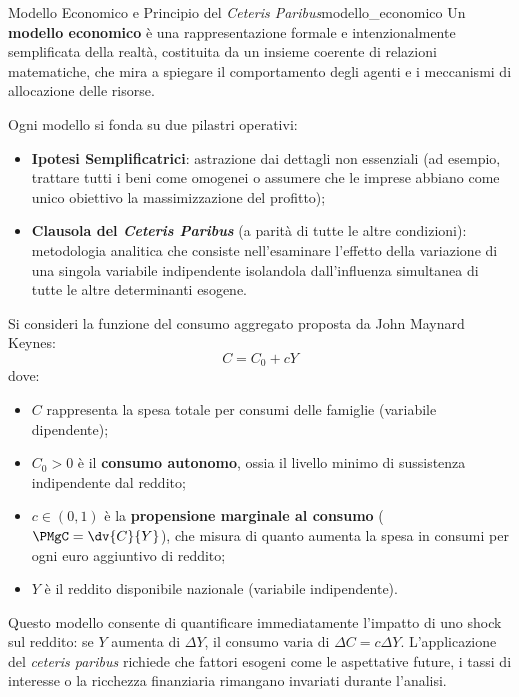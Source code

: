 \begin{modello}{Modello Economico e Principio del \textit{Ceteris Paribus}}{modello_economico}
Un \textbf{modello economico} è una rappresentazione formale e intenzionalmente semplificata della realtà, costituita da un insieme coerente di relazioni matematiche, che mira a spiegare il comportamento degli agenti e i meccanismi di allocazione delle risorse.

Ogni modello si fonda su due pilastri operativi:
\begin{itemize}
    \item \textbf{Ipotesi Semplificatrici}: astrazione dai dettagli non essenziali (ad esempio, trattare tutti i beni come omogenei o assumere che le imprese abbiano come unico obiettivo la massimizzazione del profitto);
    \item \textbf{Clausola del \textit{Ceteris Paribus}} (a parità di tutte le altre condizioni): metodologia analitica che consiste nell'esaminare l'effetto della variazione di una singola variabile indipendente isolandola dall'influenza simultanea di tutte le altre determinanti esogene.
\end{itemize}
\end{modello}

\begin{esempio}
Si consideri la funzione del consumo aggregato proposta da John Maynard Keynes:
\begin{equation}
    C = C_0 + c Y
\end{equation}
dove:
\begin{itemize}
    \item $C$ rappresenta la spesa totale per consumi delle famiglie (variabile dipendente);
    \item $C_0 > 0$ è il \textbf{consumo autonomo}, ossia il livello minimo di sussistenza indipendente dal reddito;
    \item $c \in (0, 1)$ è la \textbf{propensione marginale al consumo} ($\PMgC = \dv{C}{Y}$), che misura di quanto aumenta la spesa in consumi per ogni euro aggiuntivo di reddito;
    \item $Y$ è il reddito disponibile nazionale (variabile indipendente).
\end{itemize}
Questo modello consente di quantificare immediatamente l'impatto di uno shock sul reddito: se $Y$ aumenta di $\Delta Y$, il consumo varia di $\Delta C = c \Delta Y$. L'applicazione del \textit{ceteris paribus} richiede che fattori esogeni come le aspettative future, i tassi di interesse o la ricchezza finanziaria rimangano invariati durante l'analisi.
\end{esempio}

